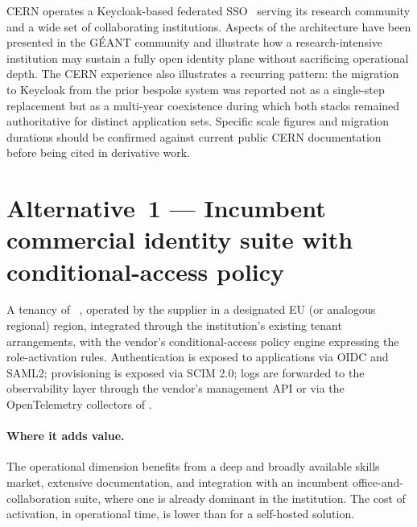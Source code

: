 \begin{realworldbox}
\noindent CERN operates a Keycloak-based federated SSO~\cite{cern-keycloak-2020} serving its
research community and a wide set of collaborating institutions.
Aspects of the architecture have been presented in the GÉANT
community and illustrate how a research-intensive institution may
sustain a fully open identity plane without sacrificing operational
depth. The CERN experience also illustrates a recurring pattern:
the migration to Keycloak from the prior bespoke system was reported
not as a single-step replacement but as a multi-year coexistence
during which both stacks remained authoritative for distinct
application sets. Specific scale figures and migration durations
should be confirmed against current public CERN documentation before
being cited in derivative work.
\end{realworldbox}

\section{Alternative~1 --- Incumbent commercial identity suite with conditional-access policy}
\label{sec:id-alt1}

\begin{alternativebox}
\noindent A tenancy of ~\cite{microsoft-entra}, operated by the supplier in a
designated EU (or analogous regional) region, integrated through the
institution's existing tenant arrangements, with the vendor's
conditional-access policy engine
expressing the role-activation rules. Authentication is exposed to
applications via OIDC and SAML2; provisioning is exposed via SCIM
2.0; logs are forwarded to the observability layer through the
vendor's management API
or via the OpenTelemetry collectors of
.
\end{alternativebox}

\paragraph{Where it adds value.} The operational dimension benefits
from a deep and broadly available skills market, extensive
documentation, and integration with an incumbent office-and-collaboration
suite, where one is already dominant in the institution. The cost
of activation, in operational time, is lower than for a self-hosted
solution.

